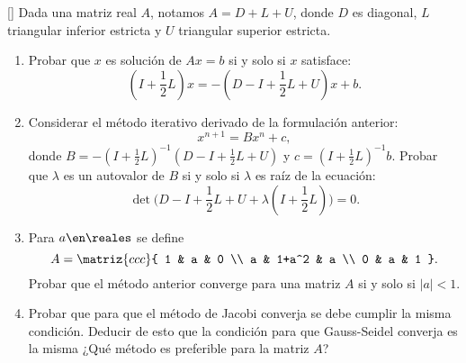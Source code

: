 \begin{enunciado}{\ejExtra}
  {\tiny[]}
  Dada una matriz real $A$, notamos $A = D + L + U$, donde $D$ es diagonal, $L$ triangular inferior estricta
  y $U$ triangular superior estricta.
  \begin{enumerate}[label=(\alph*)]
    \item Probar que $x$ es solución de $Ax = b$ si y solo si $x$ satisface:
          $$
            \textstyle
            (I + \frac{1}{2}L)x = - (D - I + \frac{1}{2}L + U)x + b.
          $$

    \item Considerar el método iterativo derivado de la formulación anterior:
          $$
            \textstyle
            x^{n+1} = Bx^n + c,
          $$
          donde $B = -(I + \frac{1}{2}L)^{-1} (D - I + \frac{1}{2} L + U)$ y $c = (I + \frac{1}{2}L)^{-1}b.$ Probar que $\lambda$
          es un autovalor de $B$ si y solo si $\lambda$ es raíz de la ecuación:
          $$
            \textstyle
            \det\big(D - I + \frac{1}{2}L + U + \lambda(I + \frac{1}{2}L)\big) = 0.
          $$

    \item Para $a \en \reales$ se define
          $$
            \textstyle
            A =
            \matriz{ccc}{
              1 & a & 0 \\
              a & 1+a^2 & a \\
              0 & a & 1
            }.
          $$
          Probar que el método anterior converge para una matriz $A$ si y solo si $|a| < 1$.

    \item Probar que para que el método de Jacobi converja se debe cumplir la misma condición. Deducir
          de esto que la condición para que Gauss-Seidel converja es la misma ¿Qué método es preferible para la
          matriz $A$?
  \end{enumerate}
\end{enunciado}

